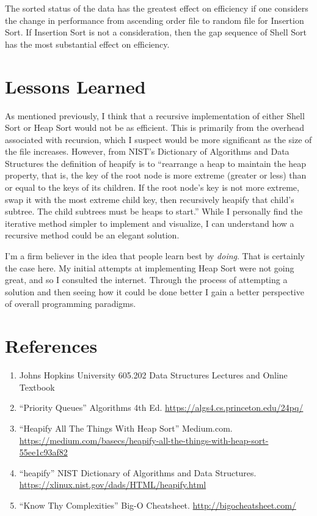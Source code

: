 \documentclass[12pt, titlepage]{article}
\begin{document}
The sorted status of the data has the greatest effect on efficiency if one considers the change in performance from ascending order file to random file for Insertion Sort. If Insertion Sort is not a consideration, then the gap sequence of Shell Sort has the most substantial effect on efficiency.

\section{Lessons Learned}
As mentioned previously, I think that a recursive implementation of either Shell Sort or Heap Sort would not be as efficient. This is primarily from the overhead associated with recursion, which I suspect would be more significant as the size of the file increases. However, from NIST's Dictionary of Algorithms and Data Structures the definition of heapify is to ``rearrange a heap to maintain the heap property, that is, the key of the root node is more extreme (greater or less) than or equal to the keys of its children. If the root node's key is not more extreme, swap it with the most extreme child key, then recursively heapify that child's subtree. The child subtrees must be heaps to start.'' While I personally find the iterative method simpler to implement and visualize, I can understand how a recursive method could be an elegant solution.

I'm a firm believer in the idea that people learn best by \textit{doing}. That is certainly the case here. My initial attempts at implementing Heap Sort were not going great, and so I consulted the internet. Through the process of attempting a solution and then seeing how it could be done better I gain a better perspective of overall programming paradigms.
 

\newpage

\section{References}
\begin{enumerate}
	\item Johns Hopkins University 605.202 Data Structures Lectures and Online Textbook
	\item ``Priority Queues'' Algorithms 4th Ed. \url{https://algs4.cs.princeton.edu/24pq/}
	\item ``Heapify All The Things With Heap Sort'' Medium.com. \url{https://medium.com/basecs/heapify-all-the-things-with-heap-sort-55ee1c93af82}
	\item ``heapify'' NIST Dictionary of Algorithms and Data Structures. \url{https://xlinux.nist.gov/dads/HTML/heapify.html}
	\item ``Know Thy Complexities'' Big-O Cheatsheet. \url{http://bigocheatsheet.com/}	
\end{enumerate}
\end{document}
